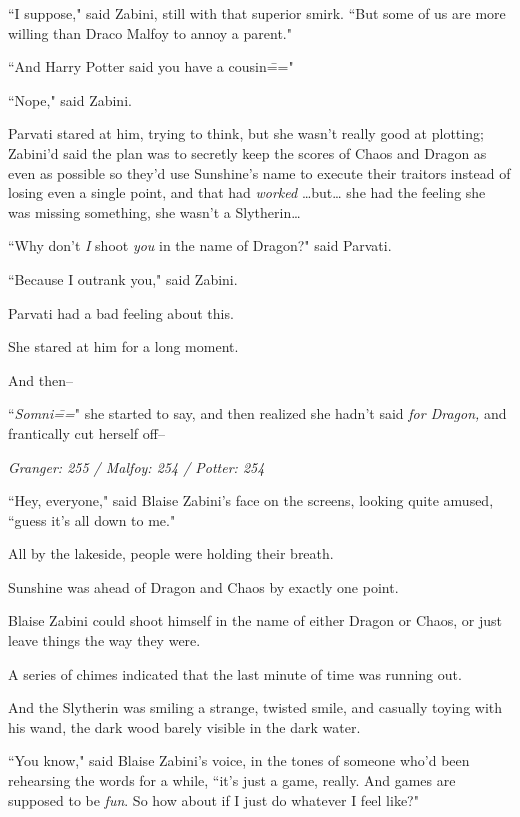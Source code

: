 ``I suppose," said Zabini, still with that superior smirk. ``But some of us are more willing than Draco Malfoy to annoy a parent."

``And Harry Potter said you have a cousin\==="

``Nope," said Zabini.

Parvati stared at him, trying to think, but she wasn't really good at plotting; Zabini'd said the plan was to secretly keep the scores of Chaos and Dragon as even as possible so they'd use Sunshine's name to execute their traitors instead of losing even a single point, and that had \emph{worked} {\ldots}but{\ldots} she had the feeling she was missing something, she wasn't a Slytherin{\ldots}

``Why don't \emph{I} shoot \emph{you} in the name of Dragon?" said Parvati.

``Because I outrank you," said Zabini.

Parvati had a bad feeling about this.

She stared at him for a long moment.

And then\---

``\emph{Somni\===}" she started to say, and then realized she hadn't said \emph{for Dragon,} and frantically cut herself off\---

\later

\emph{Granger: 255 / Malfoy: 254 / Potter: 254}

``Hey, everyone," said Blaise Zabini's face on the screens, looking quite amused, ``guess it's all down to me."

All by the lakeside, people were holding their breath.

Sunshine was ahead of Dragon and Chaos by exactly one point.

Blaise Zabini could shoot himself in the name of either Dragon or Chaos, or just leave things the way they were.

A series of chimes indicated that the last minute of time was running out.

And the Slytherin was smiling a strange, twisted smile, and casually toying with his wand, the dark wood barely visible in the dark water.

``You know," said Blaise Zabini's voice, in the tones of someone who'd been rehearsing the words for a while, ``it's just a game, really. And games are supposed to be \emph{fun}. So how about if I just do whatever I feel like?"


